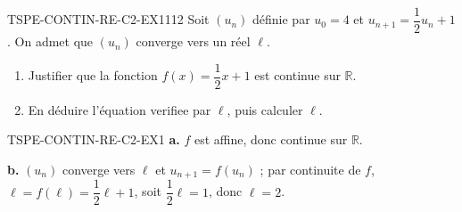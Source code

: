 

\begin{exercice}{TSPE-CONTIN-RE-C2-EX1}{1}{12}
Soit $(u_n)$ définie par $u_0 = 4$ et $u_{n+1} = \dfrac{1}{2}u_n + 1$. On admet que $(u_n)$ converge vers un réel $\ell$.
\begin{enumerate}
  \item Justifier que la fonction $f(x)=\dfrac{1}{2}x+1$ est continue sur $\mathbb{R}$.
  \item En déduire l'équation verifiee par $\ell$, puis calculer $\ell$.
\end{enumerate}
\end{exercice}


\begin{corrige}{TSPE-CONTIN-RE-C2-EX1}
\textbf{a.} $f$ est affine, donc continue sur $\mathbb{R}$.

\textbf{b.} $(u_n)$ converge vers $\ell$ et $u_{n+1}=f(u_n)$ ; par continuite de $f$, $\ell = f(\ell) = \dfrac{1}{2}\ell + 1$, soit $\dfrac{1}{2}\ell = 1$, donc $\ell = 2$.
\end{corrige}
